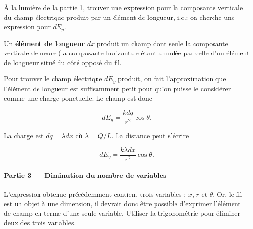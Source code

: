À la lumière de la partie 1, trouver une expression pour la composante
verticale du champ électrique produit par un élément de longueur, i.e.: on
cherche une expression pour $dE_y$.

\begin{center}
\end{center}

  Un \textbf{élément de longueur} $d x$ produit un champ dont seule la
  composante verticale demeure (la composante horizontale étant annulée par
  celle d'un élément de longueur situé du côté opposé du fil.

  Pour trouver le champ électrique $dE_y$ produit, on fait l'approximation que
  l'élément de longueur est suffisamment petit pour qu'on puisse le considérer
  comme une charge ponctuelle. Le champ est donc

  $$d E_y = \frac{k d q}{r^2} \cos\theta.$$

  La charge est $dq = \lambda dx$ où $\lambda = Q / L$. La distance peut
  s'écrire

  $$d E_y = \frac{k \lambda dx}{r^2} \cos\theta.$$



\paragraph{Partie 3 --- Diminution du nombre de variables}

L'expression obtenue précédemment contient trois variables : $x$, $r$ et
$\theta$. Or, le fil est un objet à une dimension, il devrait donc être
possible d'exprimer l'élément de champ en terme d'une seule variable. Utiliser
la trigonométrie pour éliminer deux des trois variables.


